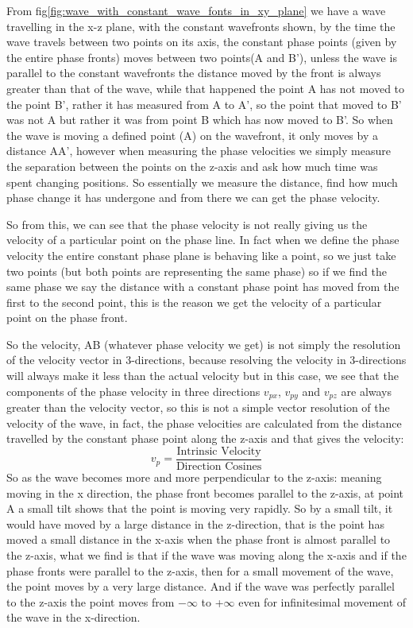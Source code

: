 From fig\ref{fig:wave_with_constant_wave_fonts_in_xy_plane} we have a wave travelling in the x-z plane, with the constant wavefronts shown, by the time the wave travels between two points on its axis, the constant phase points (given by the entire phase fronts) moves between two points(A and B'), unless the wave is parallel to the constant wavefronts the distance moved by the front is always greater than that of the wave, while that happened the point A has not moved to the point B', rather it has measured from A to A', so the point that moved to B' was not A but rather it was from point B which has now moved to B'. So when the wave is moving a defined point (A) on the wavefront, it only moves by a distance AA', however when measuring the phase velocities we simply measure the separation between the points on the z-axis and ask how much time was spent changing positions. So essentially we measure the distance, find how much phase change it has undergone and from there we can get the phase velocity.

So from this, we can see that the phase velocity is not really giving us the velocity of a particular point on the phase line. In fact when we define the phase velocity the entire constant phase plane is behaving like a point, so we just take two points (but both points are representing the same phase) so if we find the same phase we say the distance with a constant phase point has moved from the first to the second point, this is the reason we get the velocity of a particular point on the phase front.

So the velocity, AB (whatever phase velocity we get) is not simply the resolution of the velocity vector in 3-directions, because resolving the velocity in 3-directions will always make it less than the actual velocity but in this case, we see that the components of the phase velocity in three directions $v_{px}$, $v_{py}$ and $v_{pz}$ are always greater than the velocity vector, so this is not a simple vector resolution of the velocity of the wave, in fact, the phase velocities are calculated from the distance travelled by the constant phase point along the z-axis and that gives the velocity:
\begin{dmath*}
v_p = \frac{\text{Intrinsic Velocity}}{\text{Direction Cosines}}
\end{dmath*}
So as the wave becomes more and more perpendicular to the z-axis: meaning moving in the x direction, the phase front becomes parallel to the z-axis, at point A a small tilt shows that the point is moving very rapidly. So by a small tilt, it would have moved by a large distance in the z-direction, that is the point has moved a small distance in the x-axis when the phase front is almost parallel to the z-axis, what we find is that if the wave was moving along the x-axis and if the phase fronts were parallel to the z-axis, then for a small movement of the wave, the point moves by a very large distance. And if the wave was perfectly parallel to the z-axis the point moves from $-\infty$ to +$\infty$ even for infinitesimal movement of the wave in the x-direction.

